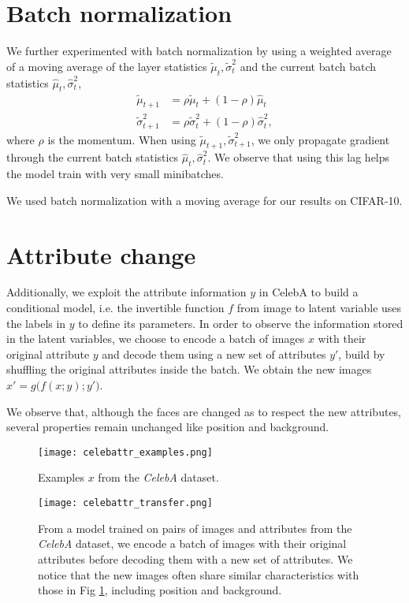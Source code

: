 \documentclass{article}
\begin{document}
\section{Batch normalization} \label{sec batch norm}
We further experimented with batch normalization by using a weighted average of a moving average of the layer statistics $\tilde{\mu}_{t}, \tilde{\sigma}^{2}_{t}$ and the current batch batch statistics $\hat{\mu}_{t}, \hat{\sigma}_{t}^{2}$,
\begin{align}
\tilde{\mu}_{t+1} &= \rho \tilde{\mu}_{t} + (1 - \rho) \hat{\mu}_{t} \\
\tilde{\sigma}^2_{t+1} &= \rho \tilde{\sigma}^2_{t} + (1 - \rho) \hat{\sigma}^2_{t},
\end{align}
where $\rho$ is the momentum.
When using $\tilde{\mu}_{t+1}, \tilde{\sigma}_{t+1}^{2}$, we only propagate gradient through the current batch statistics $\hat{\mu}_{t}, \hat{\sigma}_{t}^{2}$. We observe that using this lag helps the model train with very small minibatches.

We used batch normalization with a moving average for our results on CIFAR-10.

\section{Attribute change}\label{app attr change}
Additionally, we exploit the attribute information $y$ in CelebA to build a conditional model, i.e. the invertible function $f$ from image to latent variable uses the labels in $y$ to define its parameters. In order to observe the information stored in the latent variables, we choose to encode a batch of images $x$ with their original attribute $y$ and decode them using a new set of attributes $y'$, build by shuffling the original attributes inside the batch. We obtain the new images $x' = g\big(f(x; y); y'\big)$.

We observe that, although the faces are changed as to respect the new attributes, several properties remain unchanged like position and background.

\begin{figure}[H]
\vspace{80pt}
    \centering \texttt{[image: celebattr\_examples.png]}
    \caption{Examples $x$ from the \emph{CelebA} dataset.}
    \label{fig:transfer-original}
\end{figure}

\begin{figure}[H]
\vspace{80pt}
    \centering \texttt{[image: celebattr\_transfer.png]}
    \caption{From a model trained on pairs of images and attributes from the \emph{CelebA} dataset, we encode a batch of images with their original attributes before decoding them with a new set of attributes. We notice that the new images often share similar characteristics with those in Fig \ref{fig:transfer-original}, including position and background.}
\end{figure}
\fi
\end{document}
